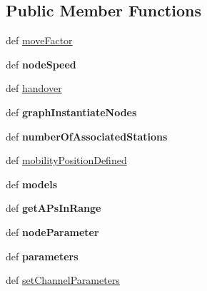 \subsection*{Public Member Functions}
\begin{DoxyCompactItemize}
\item 
def \hyperlink{classmininet_1_1wifiMobility_1_1mobility_a7bfaf78133f30c9d812e7dd77fa836fd}{move\-Factor}
\item 
\hypertarget{classmininet_1_1wifiMobility_1_1mobility_acc7aa8b98704f410356e6d7ec4fb2be9}{def {\bfseries node\-Speed}}\label{classmininet_1_1wifiMobility_1_1mobility_acc7aa8b98704f410356e6d7ec4fb2be9}

\item 
def \hyperlink{classmininet_1_1wifiMobility_1_1mobility_a33bd8550eead3027d47320d1d4710896}{handover}
\item 
\hypertarget{classmininet_1_1wifiMobility_1_1mobility_ab1b2e7fa1a8ddcdbf0c2300a9d16e379}{def {\bfseries graph\-Instantiate\-Nodes}}\label{classmininet_1_1wifiMobility_1_1mobility_ab1b2e7fa1a8ddcdbf0c2300a9d16e379}

\item 
\hypertarget{classmininet_1_1wifiMobility_1_1mobility_a2e293ad5b68de48662ca61c151d6a088}{def {\bfseries number\-Of\-Associated\-Stations}}\label{classmininet_1_1wifiMobility_1_1mobility_a2e293ad5b68de48662ca61c151d6a088}

\item 
def \hyperlink{classmininet_1_1wifiMobility_1_1mobility_a08948c132bec721adc84746465bc76e7}{mobility\-Position\-Defined}
\item 
\hypertarget{classmininet_1_1wifiMobility_1_1mobility_a761828b57c33888c3ec79ab655dbc49b}{def {\bfseries models}}\label{classmininet_1_1wifiMobility_1_1mobility_a761828b57c33888c3ec79ab655dbc49b}

\item 
\hypertarget{classmininet_1_1wifiMobility_1_1mobility_ae958b9813f2c7c7495a50789d0c3bc0e}{def {\bfseries get\-A\-Ps\-In\-Range}}\label{classmininet_1_1wifiMobility_1_1mobility_ae958b9813f2c7c7495a50789d0c3bc0e}

\item 
\hypertarget{classmininet_1_1wifiMobility_1_1mobility_aab2327db40b2a55c84bd9af735187ceb}{def {\bfseries node\-Parameter}}\label{classmininet_1_1wifiMobility_1_1mobility_aab2327db40b2a55c84bd9af735187ceb}

\item 
\hypertarget{classmininet_1_1wifiMobility_1_1mobility_ac7413d5b666c845b2615087906d68042}{def {\bfseries parameters}}\label{classmininet_1_1wifiMobility_1_1mobility_ac7413d5b666c845b2615087906d68042}

\item 
def \hyperlink{classmininet_1_1wifiMobility_1_1mobility_af44d34258ad9306b65c1f02fae3c42e9}{set\-Channel\-Parameters}
\end{DoxyCompactItemize}
